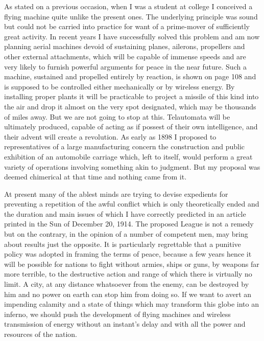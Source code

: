 \documentclass[a4paper,12pt,english,twoside,openright]{memoir}
\begin{document}
As stated on a previous occasion, when I was a student at college I conceived a flying machine 
quite unlike the present ones.  The underlying principle was sound but could not be carried into 
practice for want of a prime-mover of sufficiently great activity.  In recent years I have 
successfully solved this problem and am now planning aerial machines devoid of sustaining 
planes, ailerons, propellers and other external attachments, which will be capable of immense 
speeds and are very likely to furnish powerful arguments for peace in the near future.  Such a 
machine, sustained and propelled entirely by reaction, is shown on page 108 and is supposed to 
be controlled either mechanically or by wireless energy.  By installing proper plants it will be 
practicable to project a missile of this kind into the air and drop it almost on the very spot 
designated, which may be thousands of miles away.  But we are not going to stop at this.  
Telautomata will be ultimately produced, capable of acting as if possest of their own intelligence, 
and their advent will create a revolution.  As early as 1898 I proposed to representatives of a 
large manufacturing concern the construction and public exhibition of an automobile carriage 
which, left to itself, would perform a great variety of operations involving something akin to 
judgment.  But my proposal was deemed chimerical at that time and nothing came from it.  

At present many of the ablest minds are trying to devise expedients for preventing a repetition of 
the awful conflict which is only theoretically ended and the duration and main issues of which I 
have correctly predicted in an article printed in the Sun of December 20, 1914.  The proposed 
League is not a remedy but on the contrary, in the opinion of a number of competent men, may 
bring about results just the opposite.  It is particularly regrettable that a punitive policy was 
adopted in framing the terms of peace, because a few years hence it will be possible for nations 
to fight without armies, ships or guns, by weapons far more terrible, to the destructive action and 
range of which there is virtually no limit.  A city, at any distance whatsoever from the enemy, can 
be destroyed by him and no power on earth can stop him from doing so.  If we want to avert an 
impending calamity and a state of things which may transform this globe into an inferno, we 
should push the development of flying machines and wireless transmission of energy without an 
instant's delay and with all the power and resources of the nation.

	{\centering
		\aldine\\
		\aldine\hspace{1.2em}\aldine
		\par}
	\vspace*{2cm}
	
	
\backmatter
\end{document}
